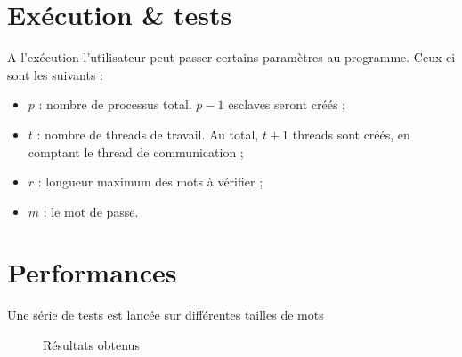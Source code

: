 \section{Exécution \& tests} %
\label{sec:execution}

A l'exécution l'utilisateur peut passer certains paramètres au programme. Ceux-ci sont les suivants :
\begin{itemize}
	\item $p$ : nombre de processus total. $p-1$ esclaves seront créés ;
	\item $t$ : nombre de threads de travail. Au total, $t+1$ threads sont créés, en comptant le thread de communication ;
	\item $r$ : longueur maximum des mots à vérifier ;
	\item $m$ : le mot de passe.
\end{itemize}


\section{Performances} %
\label{sec:perf}

Une série de tests est lancée sur différentes tailles de mots

\begin{figure}[H]
\centering
\caption{Résultats obtenus}
\label{fig:stats}
\end{figure}



